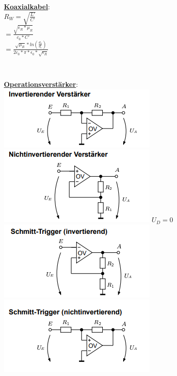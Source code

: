 \documentclass[11pt]{article}
\begin{document}
\begin{landscape}
\begin{minipage}{0.3\textwidth}
\underline{\textbf{Koaxialkabel}}:\\
$R_W = \sqrt{\frac{L'}{C'}}$\\
    \phantom{sssi} $=\frac{\sqrt{\epsilon_R * \mu_R}}{c_0 * C'}$\\
    \phantom{sssi} $=\frac{\sqrt{\mu_R} * ln(\frac{d_a}{d_i})}{2c_0 * \pi * \epsilon_0 *\sqrt{\epsilon_R}}$\\


\end{minipage}%
~~~~~~
\begin{minipage}{0.3\textwidth}
\underline{\textbf{Operationsverstärker}}:\\
\includegraphics[scale=0.40]{IOV.png}
\includegraphics[scale=0.40]{NIOV.png}
$U_D = 0$
\includegraphics[scale=0.40]{ISTOV.png}
\includegraphics[scale=0.40]{NISTOV.png}
\end{minipage}%

\end{landscape}
\end{document}

